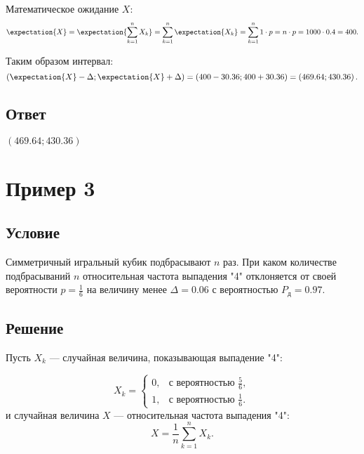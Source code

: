 \documentclass[a4paper,12pt]{article}
\begin{document}
    Математическое ожидание $X$:
    \begin{equation}
        \expectation{X} = \expectation{\sum_{k=1}^n X_k} = \sum_{k=1}^n \expectation{X_k} = \sum_{k=1}^n 1 \cdot p = n \cdot p = 1000 \cdot 0.4 = 400 .
    \end{equation}

    Таким образом интервал:
    \begin{equation}
        \left ( \expectation{X} - \Delta ; \expectation{X} + \Delta \right )
        = \left ( 400 - 30.36 ; 400 + 30.36 \right )
        = \left ( 469.64 ; 430.36 \right ) .
    \end{equation}
    \subsection*{Ответ}
    $\left ( 469.64 ; 430.36 \right )$


    \section{Пример 3}
    \subsection*{Условие}
    Симметричный игральный кубик подбрасывают $n$ раз. При каком количестве подбрасываний $n$ относительная частота выпадения "4"{} отклоняется от своей вероятности
    $p = \frac{1}{6}$ на величину менее $\Delta = 0.06$ с вероятностью $P_\text{д} = 0.97$.

    \subsection*{Решение}
    Пусть $X_k$ --- случайная величина, показывающая выпадение "4":

    \begin{equation}
        X_k =
        \left \{
        \begin{array}{ll}
            0, & \text{с вероятностью } \frac{5}{6},  \\
            1, & \text{с вероятностью } \frac{1}{6} .
        \end{array}
        \right .
    \end{equation}
    и случайная величина $X$ --- относительная частота выпадения "4":
    \begin{equation}
        X = \frac{1}{n} \sum_{k=1}^n X_k .
    \end{equation}
\end{document}
